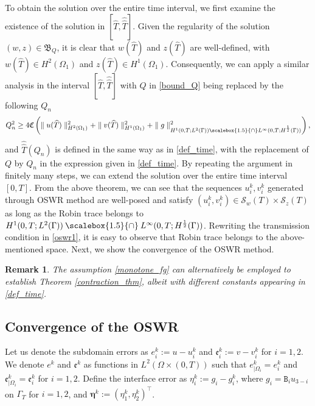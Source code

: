 \documentclass[11pt]{article}
\newcommand*{\medcap}{\mathbin{\scalebox{1.5}{\ensuremath{\cap}}}}
\newtheorem{remark}[theorem]{Remark}
\begin{document}
To obtain the solution over the entire time interval, we first examine the existence of the solution in $[\widehat{T}, \widehat{\widehat{T}}]$. Given the regularity of the solution $(w, z) \in \mathfrak{B}_Q$, it is clear that $w(\widehat{T})$ and $z(\widehat{T})$ are well-defined, with $w(\widehat{T}) \in H^2(\Omega_1)$ and $z(\widehat{T}) \in H^1(\Omega_1)$. Consequently, we can apply a similar analysis in the interval $[\widehat{T}, \widehat{\widehat{T}}]$ with $Q$ in \eqref{bound_Q} being replaced by the following $Q_n$
\begin{equation*}
Q_n^2 \geq 4 \mathfrak{C}\left( \parallel u(\widehat{T})\parallel^2_{H^2(\Omega_1)} + \parallel v(\widehat{T})\parallel^2_{H^1(\Omega_1)}  + \parallel g\parallel^2_{H^1(0, T;L^2(\Gamma))\medcap L^{\infty}(0, T;H^{\frac{1}{2}}(\Gamma))} \right),
\end{equation*}
and $\widehat{\widehat{T}}(Q_n)$ is defined in the same way as in \eqref{def_time}, with the replacement of $Q$ by $Q_n$ in the expression given in \eqref{def_time}.
By repeating the argument in finitely many steps, we can extend the solution over the entire time interval $[0, T]$.
From the above theorem, we can see that the sequences $u_i^{k}, v_i^{k}$ generated through OSWR method are well-posed and satisfy $\left( u_i^{k}, v_i^{k} \right) \in \mathcal{S}_w({T})\times\mathcal{S}_z({T})$ as long as the Robin trace belongs to $H^1(0, {T};L^2(\Gamma))\medcap L^{\infty}(0, {T};H^{\frac{1}{2}}(\Gamma))$. Rewriting the transmission condition in \eqref{oswr1}, it is easy to observe that Robin trace belongs to the above-mentioned space.  Next, we show the convergence of the OSWR method.

\begin{remark}
The assumption \eqref{monotone_fg} can alternatively be employed to establish Theorem \ref{contraction_thm}, albeit with different constants appearing in \eqref{def_time}.
\end{remark}

\subsection{Convergence of the OSWR}

Let us denote the subdomain errors as $e_i^{k}:=u-u_i^{k}$ and $\mathfrak{e}_i^{k}:=v-v_i^{k}$ for $i=1, 2$. We denote $e^{k}$ and $\mathfrak{e}^{k}$ as functions in $L^2(\Omega\times (0, T))$ such that $e^{k}_{|\Omega_i}=e_i^{k}$ and $\mathfrak{e}^{k}_{|\Omega_i}=\mathfrak{e}_i^{k}$ for $i=1, 2$. Define the interface error as $\eta_i^{k}:=g_{i}-g_i^{k}$, where $g_i=\mathtt{B}_iu_{3-i}$ on $\Gamma_T$ for $i=1,2$, and $\boldsymbol{\eta}^{k}:=\left( \eta_1^{k}, \eta_2^{k} \right)^{\top}$.
\end{document}
